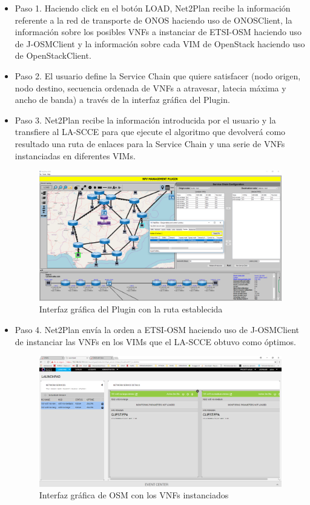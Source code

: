 \begin{itemize}
	\item Paso 1. Haciendo click en el botón LOAD, Net2Plan recibe la información referente a la red de transporte de ONOS haciendo uso de ONOSClient, la información sobre los posibles VNFs a instanciar de ETSI-OSM haciendo uso de J-OSMClient y la información sobre cada VIM de OpenStack haciendo uso de OpenStackClient.
	
	\item Paso 2. El usuario define la Service Chain que quiere satisfacer (nodo origen, nodo destino, secuencia ordenada de VNFs a atravesar, latecia máxima y ancho de banda) a través de la interfaz gráfica del Plugin.
	
	\item Paso 3. Net2Plan recibe la información introducida por el usuario y la transfiere al LA-SCCE para que ejecute el algoritmo que devolverá como resultado una ruta de enlaces para la Service Chain y una serie de VNFs instanciadas en diferentes VIMs.
	
		\begin{figure}[!ht]
		\centering
		\includegraphics[width=0.7\linewidth]{imagenes/nfv_service_chain}
		\caption{Interfaz gráfica del Plugin con la ruta establecida}
		\label{fig:nfvservicechain}
	\end{figure}
	
	\item Paso 4. Net2Plan envía la orden a ETSI-OSM haciendo uso de J-OSMClient de instanciar las VNFs en los VIMs que el LA-SCCE obtuvo como óptimos.
	
	\begin{figure}[!ht]
		\centering
		\includegraphics[width=0.7\linewidth]{imagenes/osm_vnfs}
		\caption{Interfaz gráfica de OSM con los VNFs instanciados}
		\label{fig:osmvnfs}
	\end{figure}
	

\end{itemize}
